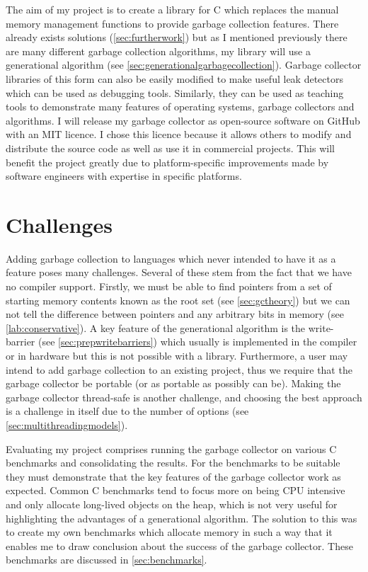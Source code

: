 \documentclass[../diss.tex]{subfiles}
\begin{document}
The aim of my project is to create a library for C which replaces the manual memory management functions to provide garbage collection features. There already exists solutions (\cref{sec:furtherwork}) but as I mentioned previously there are many different garbage collection algorithms, my library will use a generational algorithm (see \cref{sec:generationalgarbagecollection}). Garbage collector libraries of this form can also be easily modified to make useful leak detectors which can be used as debugging tools. Similarly, they can be used as teaching tools to demonstrate many features of operating systems, garbage collectors and algorithms. I will release my garbage collector as open-source software on GitHub with an MIT licence. I chose this licence because it allows others to modify and distribute the source code as well as use it in commercial projects. This will benefit the project greatly due to platform-specific improvements made by software engineers with expertise in specific platforms.

\section{Challenges}

Adding garbage collection to languages which never intended to have it as a feature poses many challenges. Several of these stem from the fact that we have no compiler support. Firstly, we must be able to find pointers from a set of starting memory contents known as the root set (see \cref{sec:gctheory}) but we can not tell the difference between pointers and any arbitrary bits in memory (see \cref{lab:conservative}). A key feature of the generational algorithm is the write-barrier (see \cref{sec:prepwritebarriers}) which usually is implemented in the compiler or in hardware but this is not possible with a library. Furthermore, a user may intend to add garbage collection to an existing project, thus we require that the garbage collector be portable (or as portable as possibly can be). Making the garbage collector thread-safe is another challenge, and choosing the best approach is a challenge in itself due to the number of options (see \cref{sec:multithreadingmodels}). 

Evaluating my project comprises running the garbage collector on various C benchmarks and consolidating the results. For the benchmarks to be suitable they must demonstrate that the key features of the garbage collector work as expected. Common C benchmarks tend to focus more on being CPU intensive and only allocate long-lived objects on the heap, which is not very useful for highlighting the advantages of a generational algorithm. The solution to this was to create my own benchmarks which allocate memory in such a way that it enables me to draw conclusion about the success of the garbage collector. These benchmarks are discussed in \cref{sec:benchmarks}.
\end{document}
